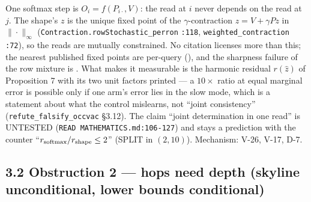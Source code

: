 \documentclass[11pt,a4paper]{article}
\theoremstyle{plain}
\theoremstyle{definition}
\theoremstyle{remark}
\begin{document}
One softmax step is \(O_i=f(P_{i\cdot},V)\): the read at \(i\) never
depends on the read at \(j\). The shape's \(z\) is the unique fixed
point of the \(\gamma\)-contraction \(z=V+\gamma Pz\) in
\(\|\cdot\|_\infty\) (\texttt{Contraction.rowStochastic\_perron}
\texttt{:118}, \texttt{weighted\_contraction} \texttt{:72}), so the
reads are mutually constrained. No citation licenses more than this; the
nearest published fixed points are per-query
(\citep{ramsauer-2021-hopfield}), and the sharpness failure of the row
mixture is \citep{velickovic-2025-softmaxnotenough}. What makes it
measurable is the harmonic residual \(r(\hat z)\) of Proposition 7 with
its two unit factors printed --- a \(10\times\) ratio at equal marginal
error is possible only if one arm's error lies in the slow mode, which
is a statement about what the control mislearns, not ``joint
consistency'' (\texttt{refute\_falsify\_occvac} §3.12). The claim
``joint determination in one read'' is UNTESTED
(\texttt{READ\ MATHEMATICS.md:106-127}) and stays a prediction with the
counter ``\(r_{\rm softmax}/r_{\rm shape}\le2\)'' (SPLIT in \((2,10)\)).
Mechanism: V-26, V-17, D-7.

\subsection{3.2 Obstruction 2 --- hops need depth (skyline
unconditional, lower bounds
conditional)}\label{obstruction-2-hops-need-depth-skyline-unconditional-lower-bounds-conditional}
\end{document}
